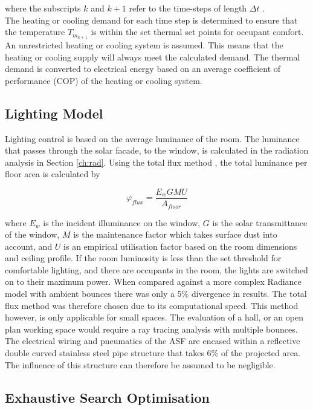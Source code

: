 where the subscripts $k$ and $k+1$ refer to the time-steps of length $\Delta t$ \cite{crank1947practical}.\\

The heating or cooling demand for each time step is determined to ensure that the temperature $T_{m_{k+1}}$ is within the set thermal set points for occupant comfort. An unrestricted heating or cooling system is assumed. This means that the heating or cooling supply will always meet the calculated demand. The thermal demand is converted to electrical energy based on an average coefficient of performance (COP) of the heating or cooling system. 

\subsection{Lighting Model}
Lighting control is based on the average luminance of the room. The luminance that passes through the solar facade, to the window, is calculated in the radiation analysis in Section \ref{ch:rad}. Using the total flux method \cite{szokolay1980handbook}, the total luminance per floor area is calculated by 

\begin{equation} 
\label{eq:lighting}
      \varphi_{flux}={\frac{E_w G M U}{A_{floor}}}
\end{equation}

where $E_w$ is the incident illuminance on the window, $G$ is the solar transmittance of the window, $M$ is the maintenance factor which takes surface dust into account, and $U$ is an empirical utilisation factor based on the room dimensions and ceiling profile. If the room luminosity is less than the set threshold for comfortable lighting, and there are occupants in the room, the lights are switched on to their maximum power. When compared against a more complex Radiance model with ambient bounces there was only a 5\% divergence in results. The total flux method was therefore chosen due to its computational speed. This method however, is only applicable for small spaces. The evaluation of a hall, or an open plan working space would require a ray tracing analysis with multiple bounces. The electrical wiring and pneumatics of the ASF are encased within a reflective double curved stainless steel pipe structure that takes 6\% of the projected area. The influence of this structure can therefore be assumed to be negligible. 

\subsection{Exhaustive Search Optimisation}

